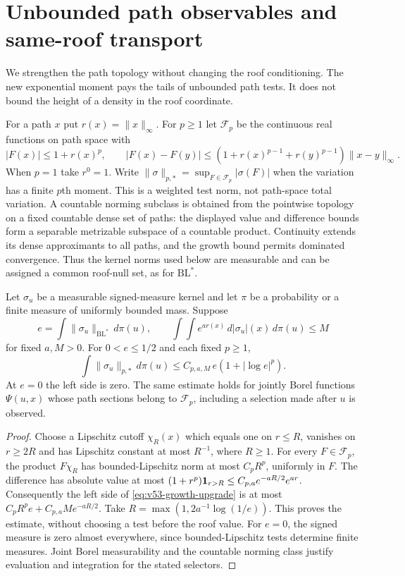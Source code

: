 \section{Unbounded path observables and same-roof transport}
\label{sec:v53-same-roof-transport}
We strengthen the path topology without changing the roof conditioning.
The new exponential moment pays the tails of unbounded path tests.
It does not bound the height of a density in the roof coordinate.

For a path $x$ put $r(x)=\|x\|_\infty$. For $p\ge1$ let
$\mathcal F_p$ be the continuous real functions on path space with
\[
 |F(x)|\le1+r(x)^p,\qquad
 |F(x)-F(y)|\le
 (1+r(x)^{p-1}+r(y)^{p-1})\|x-y\|_\infty.
\]
When $p=1$ take $r^0=1$. Write
$\|\sigma\|_{p,*}=\sup_{F\in\mathcal F_p}|\sigma(F)|$ when the
variation has a finite $p$th moment. This is a weighted test norm,
not path-space total variation. A countable norming subclass is
obtained from the pointwise topology on a fixed countable dense set
of paths: the displayed value and difference bounds form a separable
metrizable subspace of a countable product. Continuity extends its
dense approximants to all paths, and the growth bound permits dominated
convergence. Thus the kernel norms used below are measurable and can
be assigned a common roof-null set, as for $\mathrm{BL}^*$.

\begin{lemma}
\label{lem:v53-growth-upgrade}
Let $\sigma_u$ be a measurable signed-measure kernel and let $\pi$ be
a probability or a finite measure of uniformly bounded mass. Suppose
\[
 e=\int\|\sigma_u\|_{\mathrm{BL}^*}\,d\pi(u),\qquad
 \int\int e^{a r(x)}\,d|\sigma_u|(x)\,d\pi(u)\le M
\]
for fixed $a,M>0$. For $0<e\le1/2$ and each fixed $p\ge1$,
\begin{equation}\label{eq:v53-growth-upgrade}
 \int\|\sigma_u\|_{p,*}\,d\pi(u)
              \le C_{p,a,M}\,e(1+|\log e|^p).
\end{equation}
At $e=0$ the left side is zero. The same estimate holds for
jointly Borel functions $\Psi(u,x)$ whose path sections belong to
$\mathcal F_p$, including a selection made after $u$ is observed.
\end{lemma}
\begin{proof}
Choose a Lipschitz cutoff $\chi_R(x)$ which equals one on $r\le R$,
vanishes on $r\ge2R$ and has Lipschitz constant at most $R^{-1}$,
where $R\ge1$. For every $F\in\mathcal F_p$, the product $F\chi_R$
has bounded-Lipschitz norm at most $C_pR^p$, uniformly in $F$.
The difference has absolute value at most
$(1+r^p)\mathbf1_{r>R}\le C_{p,a}e^{-aR/2}e^{ar}$.
Consequently the left side of \eqref{eq:v53-growth-upgrade} is at
most $C_pR^pe+C_{p,a}Me^{-aR/2}$. Take
$R=\max(1,2a^{-1}\log(1/e))$. This proves the estimate, without
choosing a test before the roof value. For $e=0$, the signed measure
is zero almost everywhere, since bounded-Lipschitz tests determine
finite measures. Joint Borel measurability and the countable norming
class justify evaluation and integration for the stated selectors.
\end{proof}

